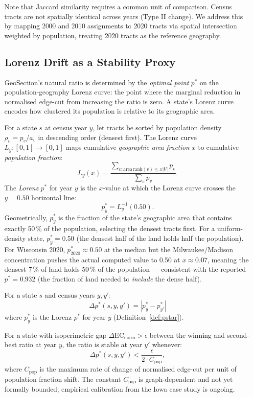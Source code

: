 Note that Jaccard similarity requires a common unit of comparison.
Census tracts are not spatially identical across years (Type II change).
We address this by mapping 2000 and 2010 assignments to 2020 tracts via
spatial intersection weighted by population, treating 2020 tracts as the
reference geography.

\subsection{Lorenz Drift as a Stability Proxy}
\label{sec:lorenz}

GeoSection's natural ratio is determined by the \emph{optimal point} $p^*$
on the population-geography Lorenz curve: the point where the marginal
reduction in normalised edge-cut from increasing the ratio is zero.
A state's Lorenz curve encodes how clustered its population is relative to
its geographic area.

\begin{definition}[Lorenz $p^*$]
\label{def:pstar}
For a state $s$ at census year $y$, let tracts be sorted by population
density $\rho_v = p_v / a_v$ in descending order (densest first).
The Lorenz curve $L_y : [0,1] \to [0,1]$ maps cumulative \emph{geographic area
fraction} $x$ to cumulative \emph{population fraction}:
\[
  L_y(x) = \frac{\sum_{v : \mathrm{area\,rank}(v) \leq x|V|} p_v}{\sum_v p_v}.
\]
The \emph{Lorenz $p^*$} for year $y$ is the $x$-value at which the Lorenz curve
crosses the $y = 0.50$ horizontal line:
\[
  p^*_y = L_y^{-1}(0.50).
\]
Geometrically, $p^*_y$ is the fraction of the state's geographic area that
contains exactly 50\,\% of the population, selecting the densest tracts first.
For a uniform-density state, $p^*_y = 0.50$ (the densest half of the land
holds half the population).
For Wisconsin 2020, $p^*_{2020} \approx 0.50$ at the median but the
Milwaukee/Madison concentration pushes the actual computed value to 0.50 at
$x \approx 0.07$, meaning the densest 7\,\% of land holds 50\,\% of the
population --- consistent with the reported $p^* = 0.932$ (the fraction of
land needed to \emph{include} the dense half).
\end{definition}

\begin{definition}
For a state $s$ and census years $y, y'$:
\[
  \Delta p^*(s, y, y') = |p^*_y - p^*_{y'}|
\]
where $p^*_y$ is the Lorenz $p^*$ for year $y$ (Definition~\ref{def:pstar}).
\end{definition}

\begin{conjecture}
\label{prop:lorenz}
For a state with isoperimetric gap $\Delta \mathrm{EC}_{\text{norm}} > \epsilon$
between the winning and second-best ratio at year $y$, the ratio is stable
at year $y'$ whenever:
\[
  \Delta p^*(s, y, y') < \frac{\epsilon}{2 \cdot C_{\text{pop}}},
\]
where $C_{\text{pop}}$ is the maximum rate of change of normalised edge-cut
per unit of population fraction shift.
The constant $C_{\text{pop}}$ is graph-dependent and not yet formally bounded;
empirical calibration from the Iowa case study is ongoing.
\end{conjecture}

